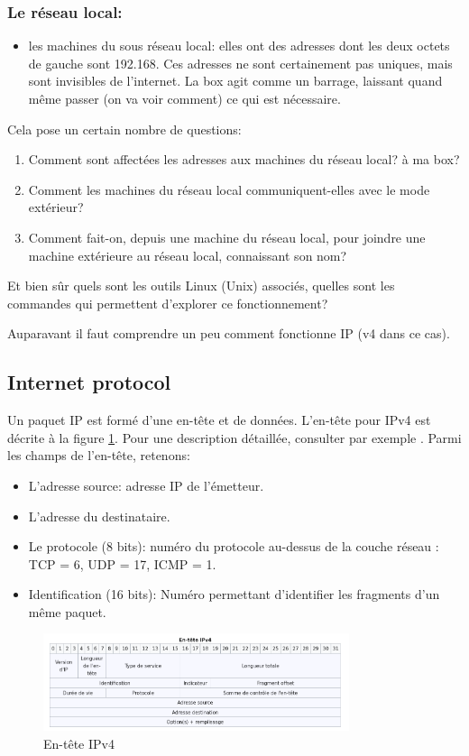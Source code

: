 \subsubsection{Le réseau local:}

\begin{itemize}
  \item les machines du sous réseau local: elles  ont des adresses
    dont les deux octets de gauche sont
  192.168. Ces adresses ne sont certainement pas
  uniques, mais sont invisibles de l'internet. La \og box\fg{} agit
    comme un barrage, laissant quand même passer (on va voir comment)
    ce qui est nécessaire. 

\end{itemize}
Cela pose un certain nombre de questions:
\begin{enumerate}

\item Comment sont affectées
  les adresses aux machines du réseau local? à ma \og box\fg?
\item Comment les machines du réseau local
  communiquent-elles avec le mode extérieur?
\item Comment fait-on, depuis une machine du réseau local,  pour
  joindre une machine extérieure au réseau 
  local, connaissant son nom?
\end{enumerate}

Et bien sûr quels sont les outils Linux (Unix) associés, quelles sont
les commandes qui permettent d'explorer ce fonctionnement?

Auparavant il faut comprendre un peu comment fonctionne IP (v4 dans ce
cas).
\subsection{Internet protocol}
Un paquet IP est formé d'une en-tête et de données. L'en-tête pour
IPv4 est
décrite à la figure \ref{entetev4}. Pour une description détaillée,
consulter par exemple \cite{v4}. Parmi les champs de l'en-tête,
retenons:
\begin{itemize}
  \item L'adresse source:
    adresse IP de l'émetteur.
  \item L'adresse du destinataire.
  \item Le protocole (8 bits):
    numéro du protocole au-dessus de la couche réseau : TCP = 6, UDP =
    17, ICMP = 1.
   \item Identification (16 bits):
    Numéro permettant d'identifier les fragments d'un même paquet.
\end{itemize}
\begin{figure}
  \includegraphics[width=0.8\textwidth]{images/entetev4.png}
  \caption{En-tête IPv4}\label{entetev4}
\end{figure}
